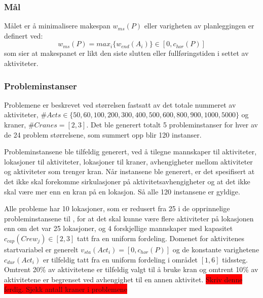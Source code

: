\subsubsection{Mål}
Målet er å minimalisere makespan $ w_{ms}(P) $ eller varigheten av planleggingen er definert ved:
\begin{equation}
w_{ms}(P) = max_{i} \{ w_{end}(A_{i}) \} \in [0,c_{hor}(P)]
\end{equation}
som sier at makespanet er likt den siste slutten eller fullføringstiden i settet av aktiviteter.

\subsubsection{Probleminstanser}
Problemene er beskrevet ved størrelsen fastsatt av det totale nummeret av aktiviteter, $ \#Acts \in \{ 50,60, 100, 200, 300, 400, 500, 600, 800, 900, 1000, 5000 \} $ og kraner, $ \#Cranes = [2,3] $. Det ble generert totalt 5 probleminstanser for hver av de 24 problem størrelsene, som summert opp blir 120 instanser.

Probleminstansene ble tilfeldig generert, ved å tilegne mannskaper til aktiviteter, lokasjoner til aktiviteter, lokasjoner til kraner, avhengigheter mellom aktiviteter og aktiviteter som trenger kran. Når instansene ble generert, er det spesifisert at det ikke skal forekomme sirkulasjoner på aktivitetsavhengigheter og at det ikke skal være mer enn en kran på en lokasjon. Så alle 120 instansene er gyldige.

Alle probleme har 10 lokasjoner, som er redusert fra 25 i de opprinnelige probleminstansene til \bht, for at det skal kunne være flere aktiviteter på lokasjonen enn om det var 25 lokasjoner, og 4 forskjellige mannskaper med kapasitet $ c_{cap}(Crew_{j}) \in [2,3] $ tatt fra en uniform fordeling. Domenet for aktivitenes startvariabel er generelt $ v_{sta}(Act_{i}) = [0,c_{hor}(P)] $ og de konstante varighetene $ c_{dur}(Act_{i}) $ er tilfeldig tatt fra en uniform fordeling i området $ [1,6] $ tidssteg. Omtrent 20\% av aktivitetene er tilfeldig valgt til å bruke kran og omtrent 10\% av aktivitetene er begrenset ved avhengighet til en annen aktivitet.
\colorbox{red}{Skriv denne ferdig. Sjekk antall kraner i problemene}